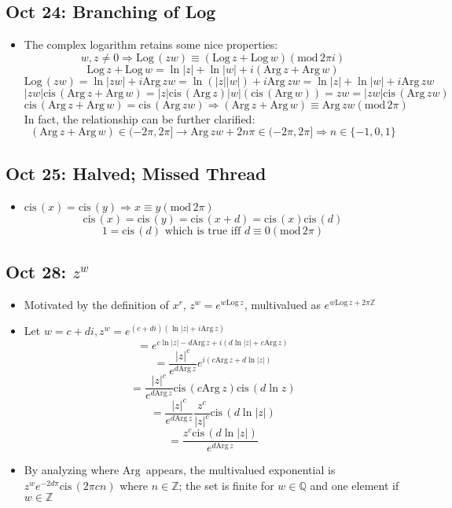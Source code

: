 \documentclass[10pt, oneside]{article}
\newcommand{\Z}{\mathbb{Z}}
\newcommand{\Q}{\mathbb{Q}}
\newcommand{\cis}{\text{cis} \,}
\newcommand{\Arg}{\text{Arg} \,}
\newcommand{\Log}{\text{Log} \,}
\renewcommand{\mod}{\text{mod} \,}
\begin{document}
\subsection{Oct 24: Branching of Log}
\begin{itemize}
    \item The complex logarithm retains some nice properties:
        \[w,z \neq 0 \Rightarrow \Log(zw) \equiv (\Log z + \Log w) (\mod 2\pi i)\]
        \[\Log z + \Log w = \ln|z| + \ln |w| + i(\Arg z + \Arg w)\]
        \[\Log(zw) = \ln|zw| + i \Arg zw = \ln(|z||w|) + i \Arg zw = \ln |z| + \ln |w| + i \Arg zw\]
        \[|zw|\cis(\Arg z + \Arg w)= |z|\cis(\Arg z)|w|(\cis(\Arg w))= zw = |zw|\cis(\Arg zw)\]
        \[\cis(\Arg z + \Arg w) = \cis(\Arg zw) \Rightarrow (\Arg z + \Arg w) \equiv \Arg zw (\mod 2\pi)\]
        In fact, the relationship can be further clarified:
        \[(\Arg z + \Arg w) \in (-2\pi,2\pi] \rightarrow \Arg zw + 2n\pi\in (-2\pi,2\pi] \Rightarrow n \in \{-1, 0, 1\}\]
\end{itemize}

\subsection{Oct 25: Halved; Missed Thread}
\begin{itemize}
    \item $\cis(x) = \cis(y) \Rightarrow x \equiv y (\mod 2\pi)$
        \[\cis(x) = \cis(y) = \cis(x+d) = \cis(x)\cis(d)\]
        \[1 = \cis(d) \text{ which is true iff $d \equiv 0 (\mod 2\pi)$}\]
\end{itemize}

\subsection{Oct 28: $z^w$}
\begin{itemize}
    \item Motivated by the definition of $x^r$, $z^w = e^{w \Log z}$, multivalued as $e^{w \Log z + 2\pi\Z}$
    \item Let $w = c + di, z^w = e^{(c + di)(\ln |z| + i \Arg z)}$
        \[= e^{c \ln |z| - d \Arg z + i(d \ln|z| + c \Arg z)}\]
        \[= \frac{|z|^c}{e^{d \Arg z}} e^{i(c \Arg z + d \ln |z|)}\]
        \[= \frac{|z|^c}{e^{d \Arg z}} \cis(c \Arg z) \cis(d \ln z)\]
        \[= \frac{|z|^c}{e^{d \Arg z}} \frac{z^c}{|z|^c} \cis(d \ln |z|)\]
        \[= \frac{z^c \cis(d \ln |z|)}{e^{d \Arg z}}\]
    \item By analyzing where $\Arg$ appears, the multivalued exponential is $z^w e^{-2d\pi}\cis(2\pi c n)$ where $n \in \Z$; the set is finite for $w \in \Q$ and one element if $w \in \Z$
\end{itemize}
\end{document}
